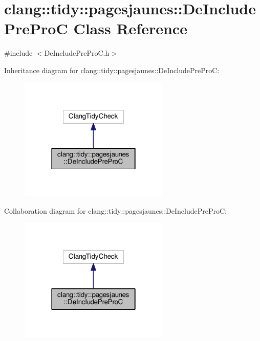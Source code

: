 \hypertarget{classclang_1_1tidy_1_1pagesjaunes_1_1_de_include_pre_pro_c}{}\section{clang\+:\+:tidy\+:\+:pagesjaunes\+:\+:De\+Include\+Pre\+ProC Class Reference}
\label{classclang_1_1tidy_1_1pagesjaunes_1_1_de_include_pre_pro_c}


{\ttfamily \#include $<$De\+Include\+Pre\+Pro\+C.\+h$>$}



Inheritance diagram for clang\+:\+:tidy\+:\+:pagesjaunes\+:\+:De\+Include\+Pre\+ProC\+:
\nopagebreak
\begin{figure}[H]
\begin{center}
\leavevmode
\includegraphics[width=202pt]{classclang_1_1tidy_1_1pagesjaunes_1_1_de_include_pre_pro_c__inherit__graph}
\end{center}
\end{figure}


Collaboration diagram for clang\+:\+:tidy\+:\+:pagesjaunes\+:\+:De\+Include\+Pre\+ProC\+:
\nopagebreak
\begin{figure}[H]
\begin{center}
\leavevmode
\includegraphics[width=202pt]{classclang_1_1tidy_1_1pagesjaunes_1_1_de_include_pre_pro_c__coll__graph}
\end{center}
\end{figure}
